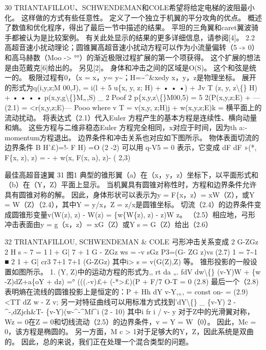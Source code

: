 \documentclass[UTF8,11pt,a4paper,openany,fontset=fandol]{ctexbook}
\begin{document}
30 TRIANTAFILLOU、SCHWENDEMAN和COLE希望将给定电梯的波阻最小化。 这样做的方式有些任意性。 定义了一个独立于机翼的平分攻角的优点。 概述了数值和优化程序，得出了最后一节中描述的结果。 平坦的三角翼和caret翼波骑手都被认为是比较案例。 有关此处显示的结果的更多详细信息，请参阅[4]。 2.2 高超音速小扰动理论；圆锥翼高超音速小扰动方程可以作为小流量偏转（5 -» 0）和高马赫数（Moo -> °°）的渐近极限过程扩展的第一个项获得。 这个扩展的想法是由范戴克[6]给出的。 另见[2]。 身体和冲击之间的区域是O(S)。 这个和弦是统一的。 极限过程有0，（x = x，y= y\textasciitilde{}；H=\textasciitilde{}\textasciicircum{}\&xedy x，y，z是物理坐标。 展开的形式为q(i,y,z;M 00,J), = i(l + 5 u\{x, y, z; H) + • • •) + Jv T (z, y, z\textbackslash\{\} H) + • • • • p(x,y,g\textbackslash\{\}M„,S) \_ 2 Poof 2 p\{x,y,z\textbackslash\{\}M00,5) = 5 2(P(x,y,z;E) + --- (2.1) = <r(x,y,z;E)--- Pooo where v T = v(x,y, z;H)j + w(x,y,z;E)k = 横平面上的流动扰动。 将表达式（2.1）代入Euler 方程产生的基本方程是连续性、横向动量和熵。 这些方程与二维非稳态Euler 方程完全相同，x对应于时间，因为th a:-momentum方程退出。 边界条件和冲击关系也对应如下图所示。 物体表面切流的边界条件 B H'£)=!- F H) =O (2 -2) 可以用 q-V5 = 0 表示，它变成 dF dF »(*, F\{x, z), z) = - + w(x, F(x, a), z)- ( 2,3)

最佳高超音速翼 31 图1 典型的锥形翼（a）在（x，y，z）坐标下，以平面形式和（b）在（Y，Z）平面上显示。 当机翼具有圆锥对称性时，方程和边界条件允许具有圆锥对称的解。 因此，身体形状可以表示为y = F\{x，z）= xW（Z），或Y = W（Z）（2.4），其中Y = y/x，Z = z/x是圆锥坐标。 切流（2.4）的边界条件变成圆锥形变量v(W(z), z) - W(z) = \{w\{W\{z), z) - z)W z。 （2.5）相应地，弓形冲击表面由y = g（x，z）= xG（Z）或Y s = G（Z）给出（2.6）

32 TRIANTAFILLOU, SCHWENDEMAN \& COLE 弓形冲击关系变成 2 G-ZGz 2 H s \textasciitilde{} 7 = 1 l + G| 7 + 1 G - ZGz ws = -v sGz P3=(G- ZG z)vs (2.7) 1 = 7\textasciitilde{}1 ■ 2 1 + G| cr3 7+1 7+1 (G-ZGz) 其中i> s = v(G(Z),Z) 等。 锥形投影的一般设置如图所示。 1. (Y, Z)中的运动方程的形式为,, rt da „. fdV dw\textbackslash\{\} (v-Y)W + \{w -Z)dZ+a\{oY + dz) =° (((.-v)£+ (-*>£)(P + F/7 O-T = 0 (2.8) 最后一个（2.8)表明熵在流线的圆锥投影上是恒定的：P + Hh dY v-Y,„, = const on- = (2.9) <TT dZ w - Z v; 另一对特征曲线可以用标准方式找到'dY\textbackslash\{\} \_ \{v-Y) 2 -\textasciicircum{}-,dZjch\&T- \{v-Y)(w-\textasciicircum{}-\textasciicircum{}Mf\textasciicircum{}i (2 - 10) 其中i fr i / v- y 对于Z中的光滑翼对称，Wz = 0在Z = 0和切线流动（2.5）的边界条件，v = Y = W（0）。 因此，Mc = 0，该方程是椭圆的。 另一方面，M c > 1对于足够大的Y，Z，因此系统是双曲的。 因此，总的来说，我们正在处理一个混合类型的问题。
\end{document}
